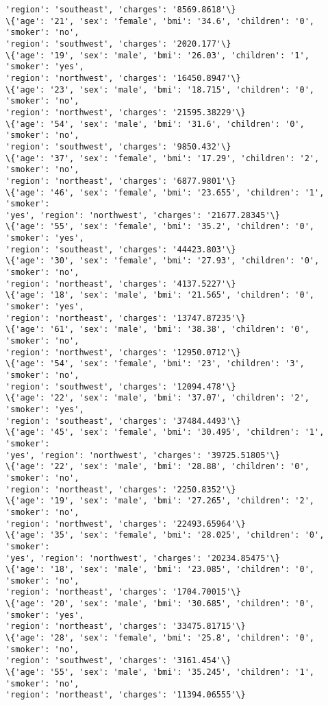 \documentclass[11pt]{article}
\begin{document}
\begin{Verbatim}[commandchars=\\\{\}]
'region': 'southeast', 'charges': '8569.8618'\}
\{'age': '21', 'sex': 'female', 'bmi': '34.6', 'children': '0', 'smoker': 'no',
'region': 'southwest', 'charges': '2020.177'\}
\{'age': '19', 'sex': 'male', 'bmi': '26.03', 'children': '1', 'smoker': 'yes',
'region': 'northwest', 'charges': '16450.8947'\}
\{'age': '23', 'sex': 'male', 'bmi': '18.715', 'children': '0', 'smoker': 'no',
'region': 'northwest', 'charges': '21595.38229'\}
\{'age': '54', 'sex': 'male', 'bmi': '31.6', 'children': '0', 'smoker': 'no',
'region': 'southwest', 'charges': '9850.432'\}
\{'age': '37', 'sex': 'female', 'bmi': '17.29', 'children': '2', 'smoker': 'no',
'region': 'northeast', 'charges': '6877.9801'\}
\{'age': '46', 'sex': 'female', 'bmi': '23.655', 'children': '1', 'smoker':
'yes', 'region': 'northwest', 'charges': '21677.28345'\}
\{'age': '55', 'sex': 'female', 'bmi': '35.2', 'children': '0', 'smoker': 'yes',
'region': 'southeast', 'charges': '44423.803'\}
\{'age': '30', 'sex': 'female', 'bmi': '27.93', 'children': '0', 'smoker': 'no',
'region': 'northeast', 'charges': '4137.5227'\}
\{'age': '18', 'sex': 'male', 'bmi': '21.565', 'children': '0', 'smoker': 'yes',
'region': 'northeast', 'charges': '13747.87235'\}
\{'age': '61', 'sex': 'male', 'bmi': '38.38', 'children': '0', 'smoker': 'no',
'region': 'northwest', 'charges': '12950.0712'\}
\{'age': '54', 'sex': 'female', 'bmi': '23', 'children': '3', 'smoker': 'no',
'region': 'southwest', 'charges': '12094.478'\}
\{'age': '22', 'sex': 'male', 'bmi': '37.07', 'children': '2', 'smoker': 'yes',
'region': 'southeast', 'charges': '37484.4493'\}
\{'age': '45', 'sex': 'female', 'bmi': '30.495', 'children': '1', 'smoker':
'yes', 'region': 'northwest', 'charges': '39725.51805'\}
\{'age': '22', 'sex': 'male', 'bmi': '28.88', 'children': '0', 'smoker': 'no',
'region': 'northeast', 'charges': '2250.8352'\}
\{'age': '19', 'sex': 'male', 'bmi': '27.265', 'children': '2', 'smoker': 'no',
'region': 'northwest', 'charges': '22493.65964'\}
\{'age': '35', 'sex': 'female', 'bmi': '28.025', 'children': '0', 'smoker':
'yes', 'region': 'northwest', 'charges': '20234.85475'\}
\{'age': '18', 'sex': 'male', 'bmi': '23.085', 'children': '0', 'smoker': 'no',
'region': 'northeast', 'charges': '1704.70015'\}
\{'age': '20', 'sex': 'male', 'bmi': '30.685', 'children': '0', 'smoker': 'yes',
'region': 'northeast', 'charges': '33475.81715'\}
\{'age': '28', 'sex': 'female', 'bmi': '25.8', 'children': '0', 'smoker': 'no',
'region': 'southwest', 'charges': '3161.454'\}
\{'age': '55', 'sex': 'male', 'bmi': '35.245', 'children': '1', 'smoker': 'no',
'region': 'northeast', 'charges': '11394.06555'\}

\end{Verbatim}
\end{document}
